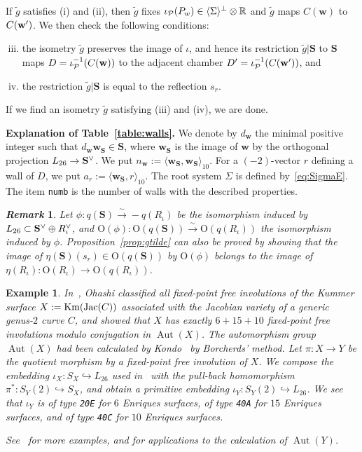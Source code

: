 \documentclass{amsart}
\newtheorem{_remark}[theorem]{\it Remark}
\newenvironment{remark}{\begin{_remark}\rm}{\end{_remark}}
\newtheorem{_example}[theorem]{Example}
\newenvironment{example}{\begin{_example}\rm}{\end{_example}}
\numberwithin{equation}{section}
\numberwithin{table}{section}
\numberwithin{figure}{section}
\newcommand{\R}{\mathord{\mathbb R}}
\newcommand{\PPP}{\mathord{\mathcal P}}
\newcommand{\inj}{\hookrightarrow}
\newcommand{\isom}{\xrightarrow{\sim}}
\newcommand{\gen}[1]{\langle {#1}  \rangle}
\newcommand{\tensor}{\otimes}
\newcommand{\sprime}{\sp\prime}
\newcommand{\sperp}{\sp{\perp}}
\newcommand{\dual}{\sp{\vee}}
\newcommand{\inv}{\sp{-1}}
\newcommand{\OG}{\mathord{\mathrm{O}}}
\newcommand{\Aut}{\operatorname{\mathrm{Aut}}\nolimits}
\newcommand{\weyl}{\mathord{\mathbf w}}
\newcommand{\intfL}[1]{\langle #1\rangle_{10}}
\newcommand{\Km}{\mathord{\rm Km}}
\newcommand{\Jac}{\mathord{\rm Jac}}
\renewcommand{\SS}{\mathbf{S}}
\begin{document}
%
If $\tilde{g}$ satisfies (i) and (ii), then
$\tilde{g}$ fixes $\iota_{\PPP}(P_{w}) \in \gen{\Sigma}\sperp\tensor\R $ %
and $\tilde{g}$ maps $C(\weyl)$ to $C(\weyl\sprime)$.
We then check the following conditions:
%
\begin{enumerate}[(i)]
\setcounter{enumi}{2}
\item  the isometry  $\tilde{g}$ preserves the image of $\iota$, and hence its restriction $\tilde{g}|\SS$ to $\SS$
maps $D=\iota_{\PPP}\inv (C(\weyl))$ to the adjacent chamber $D\sprime=\iota_{\PPP}\inv (C(\weyl\sprime))$,  and
\item  the restriction $\tilde{g}|\SS$ is equal to the reflection $s_r$.
\end{enumerate}
%
If we find an isometry $\tilde{g}$ satisfying (iii) and (iv),
we are done.
\par
\medskip
%
{\bf Explanation of Table~\ref{table:walls}.}
We  denote by $d_{\weyl}$ the minimal positive integer such that
$d_{\weyl}\weyl_{\SS}\in \SS$,
where $\weyl_{\SS}$ is the image of $\weyl$ by the orthogonal projection $L_{26}\to \SS\dual$.
We  put $n_{\weyl}:=\intfL{\weyl_{\SS}, \weyl_{\SS}}$.
For a $(-2)$-vector $r$ defining a wall of $D$, we put $a_r:=\intfL{\weyl_{\SS}, r}$.
The root system $\Sigma$ is defined by~\eqref{eq:SigmaE}.
The item \texttt{numb} is the number of walls with the described properties.
%
\begin{remark}
Let $\phi\colon q(\SS)\isom -q(R_{\iota})$
be the isomorphism induced by $L_{26}\subset \SS\dual\oplus R_{\iota}\dual$,
and  $\OG(\phi)\colon \OG(q(\SS))\isom \OG(q(R_{\iota}))$
the isomorphism induced by $\phi$.
Proposition~\ref{prop:gtilde} can also be proved by
showing that the image of $\eta(\SS)(s_r)\in \OG(q(\SS))$
by $\OG(\phi)$ belongs to the image of $\eta(R_{\iota})\colon \OG(R_{\iota})\to \OG(q(R_{\iota}))$.
\end{remark}
%
\begin{example}
In~\cite{Ohashi2009},
Ohashi classified all fixed-point free involutions
of the Kummer surface $X:=\Km(\Jac(C))$
associated with the Jacobian variety of a generic genus-$2$ curve $C$,
and showed that $X$ has
exactly $6+15+10$ fixed-point free involutions  modulo conjugation in $\Aut(X)$.
The automorphism group $\Aut(X)$
had been calculated by Kondo~\cite{Kondo1998} by Borcherds' method.
Let $\pi\colon X\to Y$ be the quotient morphism
by a fixed-point free involution of $X$.
We compose  the embedding $\iota_X\colon S_X\inj L_{26}$ used in~\cite{Kondo1998}
with the pull-back homomorphism $\pi^*\colon S_Y(2)\inj S_X$,
and obtain a primitive embedding $\iota_Y\colon S_Y (2) \inj L_{26}$.
We see that
$\iota_Y$ is  of type {\tt 20E}  for $6$ Enriques surfaces,
of type {\tt 40A}  for $15$ Enriques surfaces,
and
of type {\tt 40C}  for $10$ Enriques surfaces.
\par
See~\cite{ShimadaVeniani2019} for more examples,
and for applications to the calculation of $\Aut(Y)$.
\end{example}
\end{document}

